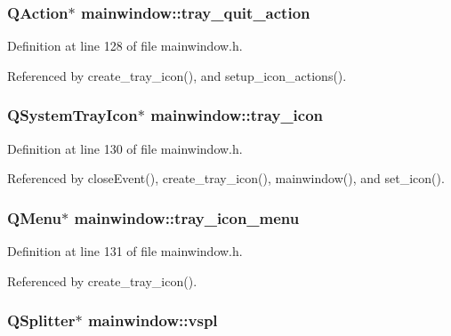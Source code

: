 \subsubsection{\setlength{\rightskip}{0pt plus 5cm}QAction$\ast$ {\bf mainwindow::tray\_\-quit\_\-action}\hspace{0.3cm}{\tt  [private]}}\label{classmainwindow_cde21d47407a20a9e298e0541988768d}




Definition at line 128 of file mainwindow.h.

Referenced by create\_\-tray\_\-icon(), and setup\_\-icon\_\-actions().
\subsubsection{\setlength{\rightskip}{0pt plus 5cm}QSystem\-Tray\-Icon$\ast$ {\bf mainwindow::tray\_\-icon}\hspace{0.3cm}{\tt  [private]}}\label{classmainwindow_a50f5901ab52e087f4704784d49d25d7}




Definition at line 130 of file mainwindow.h.

Referenced by close\-Event(), create\_\-tray\_\-icon(), mainwindow(), and set\_\-icon().
\subsubsection{\setlength{\rightskip}{0pt plus 5cm}QMenu$\ast$ {\bf mainwindow::tray\_\-icon\_\-menu}\hspace{0.3cm}{\tt  [private]}}\label{classmainwindow_f09dacf775049881fdd5c9f6ac429825}




Definition at line 131 of file mainwindow.h.

Referenced by create\_\-tray\_\-icon().
\subsubsection{\setlength{\rightskip}{0pt plus 5cm}QSplitter$\ast$ {\bf mainwindow::vspl}\hspace{0.3cm}{\tt  [private]}}\label{classmainwindow_ed628404d778a22ab7faffa6328c9b7c}




